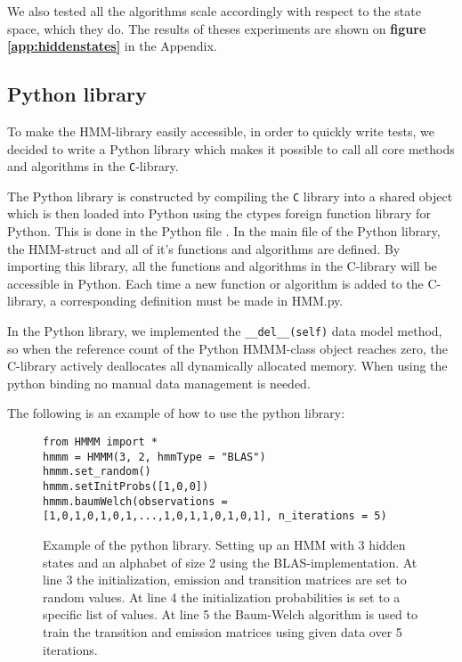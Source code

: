 We also tested all the algorithms scale accordingly with respect to the state space, which they do. The results of theses experiments are shown on \textbf{figure \ref{app:hiddenstates}} in the Appendix.

\subsection{Python library}\label{sec:pb}
To make the HMM-library easily accessible, in order to quickly write tests, we decided to write a Python library which makes it possible to call all core methods and algorithms in the \texttt{C}-library.

The Python library is constructed by compiling the \texttt{C} library into a shared object which is then loaded into Python using the ctypes\cite{ctypesman} foreign function library for Python.
This is done in the Python file .
In the main file of the Python library, the HMM-struct and all of it's functions and algorithms are defined. By importing this library, all the functions and algorithms in the C-library will be accessible in Python.
Each time a new function or algorithm is added to the C-library, a corresponding definition must be made in HMM.py.

In the Python library, we implemented the \texttt{\_\_del\_\_(self)} data model method\cite{pythonman}, so when the reference count of the Python HMMM-class object reaches zero, the C-library actively deallocates all dynamically allocated memory. When using the python binding no manual data management is needed.

The following is an example of how to use the python library:

\begin{figure}[H]
    \centering
\begin{lstlisting}[style=PYstyle]
from HMMM import *
hmmm = HMMM(3, 2, hmmType = "BLAS") 
hmmm.set_random()  
hmmm.setInitProbs([1,0,0])
hmmm.baumWelch(observations = [1,0,1,0,1,0,1,...,1,0,1,1,0,1,0,1], n_iterations = 5)\end{lstlisting}
\caption{\small{Example of the python library. Setting up an HMM with 3 hidden states and an alphabet of size 2 using the BLAS-implementation. At line 3 the initialization, emission and transition matrices are set to random values. At line 4 the initialization probabilities is set to a specific list of values.
At line 5 the Baum-Welch algorithm is used to train the transition and emission matrices using given data over 5 iterations.}}
\label{fig:pybind}
\end{figure}

